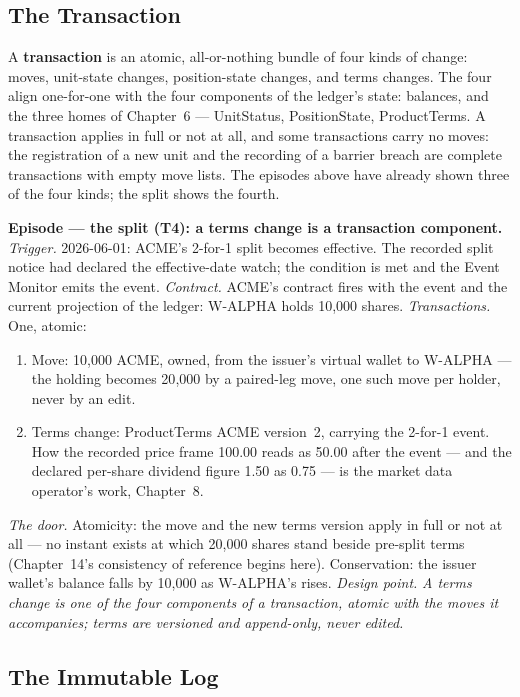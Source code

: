 \subsection{The Transaction}

A \textbf{transaction} is an atomic, all-or-nothing bundle of four kinds of change:
moves, unit-state changes, position-state changes, and terms changes. The four align
one-for-one with the four components of the ledger's state: balances, and the three
homes of Chapter~6 --- UnitStatus, PositionState, ProductTerms. A transaction applies in
full or not at all, and some transactions carry no moves: the registration of a new unit
and the recording of a barrier breach are complete transactions with empty move lists.
The episodes above have already shown three of the four kinds; the split shows the
fourth.

\medskip\noindent\textbf{Episode --- the split (T4): a terms change is a transaction
component.}
\emph{Trigger.} 2026-06-01: ACME's 2-for-1 split becomes effective. The recorded split
notice had declared the effective-date watch; the condition is met and the Event Monitor
emits the event.
\emph{Contract.} ACME's contract fires with the event and the current projection of the
ledger: W-ALPHA holds 10{,}000 shares.
\emph{Transactions.} One, atomic:
\begin{enumerate}[nosep,leftmargin=2.2em]
\item Move: 10{,}000 ACME, owned, from the issuer's virtual wallet to W-ALPHA --- the
  holding becomes 20{,}000 by a paired-leg move, one such move per holder, never by an
  edit.
\item Terms change: ProductTerms ACME version~2, carrying the 2-for-1 event. How the
  recorded price frame 100.00 reads as 50.00 after the event --- and the declared
  per-share dividend figure 1.50 as 0.75 --- is the market data operator's work,
  Chapter~8.
\end{enumerate}
\emph{The door.} Atomicity: the move and the new terms version apply in full or not at
all --- no instant exists at which 20{,}000 shares stand beside pre-split terms
(Chapter~14's consistency of reference begins here). Conservation: the issuer wallet's
balance falls by 10{,}000 as W-ALPHA's rises.
\emph{Design point.} \emph{A terms change is one of the four components of a
transaction, atomic with the moves it accompanies; terms are versioned and append-only,
never edited.}

\subsection{The Immutable Log}

